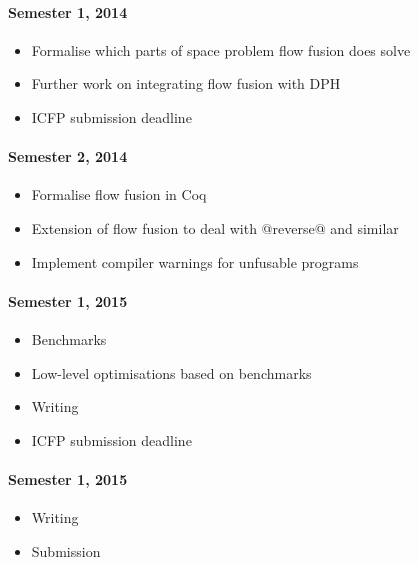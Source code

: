 \documentclass[12pt,a4paper]{article}
\begin{document}
\paragraph{Semester 1, 2014}
\begin{itemize}
\item Formalise which parts of space problem flow fusion does solve
\item Further work on integrating flow fusion with DPH
\item ICFP submission deadline
\end{itemize}

\paragraph{Semester 2, 2014}
\begin{itemize}
\item Formalise flow fusion in Coq
\item Extension of flow fusion to deal with @reverse@ and similar
\item Implement compiler warnings for unfusable programs
\end{itemize}

\paragraph{Semester 1, 2015}
\begin{itemize}
\item Benchmarks
\item Low-level optimisations based on benchmarks
\item Writing
\item ICFP submission deadline
\end{itemize}

\paragraph{Semester 1, 2015}
\begin{itemize}
\item Writing
\item Submission
\end{itemize}



\pagebreak

\end{document}
